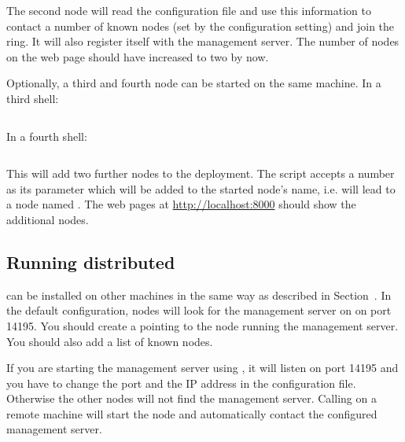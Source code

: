 The second node will read the configuration file and use this information to
contact a number of known nodes (set by the  configuration
setting) and join the ring. It will also register itself with the management
server.
The number of nodes on the web page should have increased to two by now.

Optionally, a third and fourth node can be started on the same
machine. In a third shell:
\begin{lstlisting}[language=sh]
%> ./bin/joining_node.sh 2
\end{lstlisting}

In a fourth shell:
\begin{lstlisting}[language=sh]
%> ./bin/joining_node.sh 3
\end{lstlisting}

This will add two further nodes to the deployment. The
 script accepts a number as its parameter which
will be added to the started node's name, i.e.  will lead to a node
named .
The web pages at \url{http://localhost:8000} should show the additional nodes.

\subsection{Running distributed}

\scalaris{} can be installed on other machines in the same way as
described in Section~. In the default configuration,
nodes will look for the management server on  on port 14195. You
should create a  pointing to the node running
the management server. You should also add a list of known nodes.


If you are starting the management server using , it will
listen on port 14195 and you have to change the port and the IP address in the
configuration file. Otherwise the other nodes will not find the management
server. Calling  on a remote machine will start the
node and automatically contact the configured management server.


